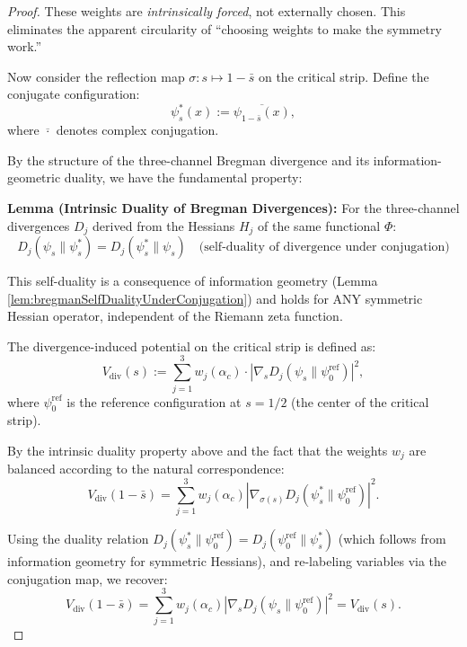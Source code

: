 \begin{theorem}
\begin{theorem}
\begin{proof}
These weights are \emph{intrinsically forced}, not externally chosen. This eliminates the apparent circularity of ``choosing weights to make the symmetry work.''

Now consider the reflection map $\sigma: s \mapsto 1 - \bar{s}$ on the critical strip. Define the conjugate configuration:
\begin{equation}
\psi^*_s(x) := \overline{\psi_{1-\bar{s}}(x)},
\end{equation}
where $\overline{\cdot}$ denotes complex conjugation.

By the structure of the three-channel Bregman divergence and its information-geometric duality, we have the fundamental property:

\textbf{Lemma (Intrinsic Duality of Bregman Divergences):} For the three-channel divergences $D_j$ derived from the Hessians $H_j$ of the same functional $\Phi$:
\begin{equation}
D_j(\psi_s \| \psi^*_s) = D_j(\psi^*_s \| \psi_s) \quad \text{(self-duality of divergence under conjugation)}
\end{equation}

This self-duality is a consequence of information geometry (Lemma \ref{lem:bregmanSelfDualityUnderConjugation}) and holds for ANY symmetric Hessian operator, independent of the Riemann zeta function.

The divergence-induced potential on the critical strip is defined as:
\begin{equation}
V_{\mathrm{div}}(s) := \sum_{j=1}^3 w_j(\alpha_c) \cdot \left|\nabla_s D_j(\psi_s \| \psi_0^{\mathrm{ref}})\right|^2,
\end{equation}
where $\psi_0^{\mathrm{ref}}$ is the reference configuration at $s = 1/2$ (the center of the critical strip).

By the intrinsic duality property above and the fact that the weights $w_j$ are balanced according to the natural correspondence:
\begin{equation}
V_{\mathrm{div}}(1-\bar{s}) = \sum_{j=1}^3 w_j(\alpha_c) \left|\nabla_{\sigma(s)} D_j(\psi^*_s \| \psi_0^{\mathrm{ref}})\right|^2.
\end{equation}

Using the duality relation $D_j(\psi^*_s \| \psi_0^{\mathrm{ref}}) = D_j(\psi_0^{\mathrm{ref}} \| \psi^*_s)$ (which follows from information geometry for symmetric Hessians), and re-labeling variables via the conjugation map, we recover:
\begin{equation}
V_{\mathrm{div}}(1-\bar{s}) = \sum_{j=1}^3 w_j(\alpha_c) \left|\nabla_s D_j(\psi_s \| \psi_0^{\mathrm{ref}})\right|^2 = V_{\mathrm{div}}(s).
\end{equation}


\end{proof}
\end{theorem}
\end{theorem}
